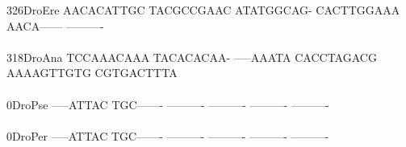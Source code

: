\documentclass[11pt,twoside,reqno,a4paper]{article}
\begin{document}
{326\hspace*{2\charwidth}DroEre	AACACATTGC	TACGCCGAAC	ATATGGCAG-	CACTTGGAAA	AACA------	----------	\\
\hspace*{5\charwidth}\hspace*{7\charwidth}\hspace*{1\charwidth}\hspace*{1\charwidth}\hspace*{1\charwidth}\hspace*{1\charwidth}\hspace*{1\charwidth}\hspace*{1\charwidth}\\
318\hspace*{2\charwidth}DroAna	TCCAAACAAA	TACACACAA-	-----AAATA	CACCTAGACG	AAAAGTTGTG	CGTGACTTTA	\\
\hspace*{5\charwidth}\hspace*{7\charwidth}\hspace*{1\charwidth}\hspace*{1\charwidth}\hspace*{1\charwidth}\hspace*{1\charwidth}\hspace*{1\charwidth}\hspace*{1\charwidth}\\
0\hspace*{4\charwidth}DroPse	-----ATTAC	TGC-------	----------	----------	----------	----------	\\
\hspace*{5\charwidth}\hspace*{7\charwidth}\hspace*{1\charwidth}\hspace*{1\charwidth}\hspace*{1\charwidth}\hspace*{1\charwidth}\hspace*{1\charwidth}\hspace*{1\charwidth}\\
0\hspace*{4\charwidth}DroPer	-----ATTAC	TGC-------	----------	----------	----------	----------	\\
\hspace*{5\charwidth}\hspace*{7\charwidth}\hspace*{1\charwidth}\hspace*{1\charwidth}\hspace*{1\charwidth}\hspace*{1\charwidth}\hspace*{1\charwidth}\hspace*{1\charwidth}\\
}
\end{document}

